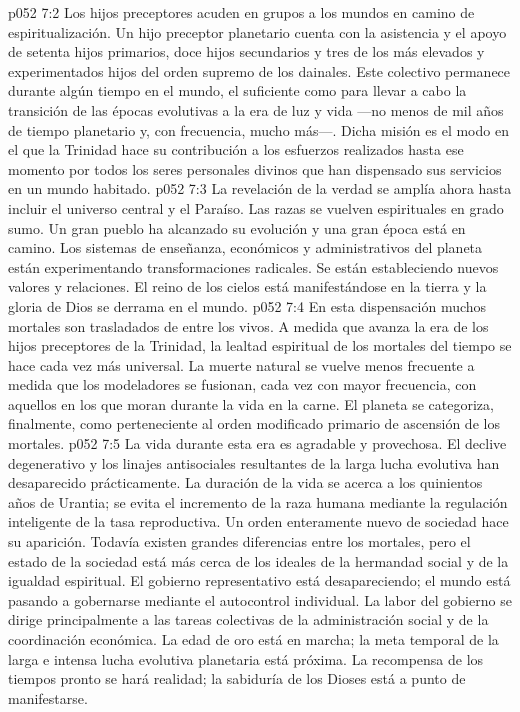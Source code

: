 \vs p052 7:2 Los hijos preceptores acuden en grupos a los mundos en camino de espiritualización. Un hijo preceptor planetario cuenta con la asistencia y el apoyo de setenta hijos primarios, doce hijos secundarios y tres de los más elevados y experimentados hijos del orden supremo de los dainales. Este colectivo permanece durante algún tiempo en el mundo, el suficiente como para llevar a cabo la transición de las épocas evolutivas a la era de luz y vida ---no menos de mil años de tiempo planetario y, con frecuencia, mucho más---. Dicha misión es el modo en el que la Trinidad hace su contribución a los esfuerzos realizados hasta ese momento por todos los seres personales divinos que han dispensado sus servicios en un mundo habitado.
\vs p052 7:3 \pc La revelación de la verdad se amplía ahora hasta incluir el universo central y el Paraíso. Las razas se vuelven espirituales en grado sumo. Un gran pueblo ha alcanzado su evolución y una gran época está en camino. Los sistemas de enseñanza, económicos y administrativos del planeta están experimentando transformaciones radicales. Se están estableciendo nuevos valores y relaciones. El reino de los cielos está manifestándose en la tierra y la gloria de Dios se derrama en el mundo.
\vs p052 7:4 En esta dispensación muchos mortales son trasladados de entre los vivos. A medida que avanza la era de los hijos preceptores de la Trinidad, la lealtad espiritual de los mortales del tiempo se hace cada vez más universal. La muerte natural se vuelve menos frecuente a medida que los modeladores se fusionan, cada vez con mayor frecuencia, con aquellos en los que moran durante la vida en la carne. El planeta se categoriza, finalmente, como perteneciente al orden modificado primario de ascensión de los mortales.
\vs p052 7:5 \pc La vida durante esta era es agradable y provechosa. El declive degenerativo y los linajes antisociales resultantes de la larga lucha evolutiva han desaparecido prácticamente. La duración de la vida se acerca a los quinientos años de Urantia; se evita el incremento de la raza humana mediante la regulación inteligente de la tasa reproductiva. Un orden enteramente nuevo de sociedad hace su aparición. Todavía existen grandes diferencias entre los mortales, pero el estado de la sociedad está más cerca de los ideales de la hermandad social y de la igualdad espiritual. El gobierno representativo está desapareciendo; el mundo está pasando a gobernarse mediante el autocontrol individual. La labor del gobierno se dirige principalmente a las tareas colectivas de la administración social y de la coordinación económica. La edad de oro está en marcha; la meta temporal de la larga e intensa lucha evolutiva planetaria está próxima. La recompensa de los tiempos pronto se hará realidad; la sabiduría de los Dioses está a punto de manifestarse.
